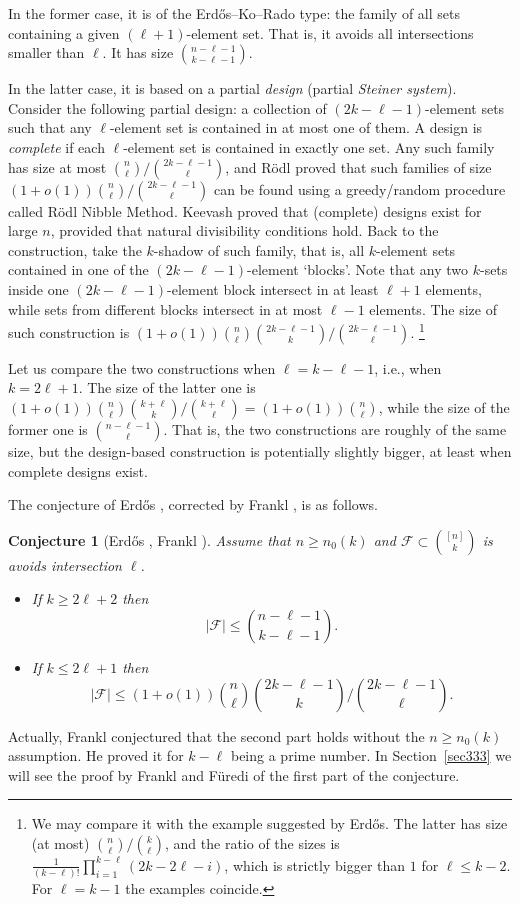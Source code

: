 \documentclass[graybox]{svmult}
\renewcommand{\le}{\leqslant}
\renewcommand{\ge}{\geqslant}
\newcommand{\ff}{\mathcal{F}}
\newtheorem{conj}{Conjecture}
\begin{document}
In the former case, it is of the Erd\H os--Ko--Rado type: the family of all sets containing a given $(\ell+1)$-element set. That is, it avoids all intersections smaller than $\ell$. It has size ${n-\ell-1\choose k-\ell-1}$.

In the latter case, it is based on a partial {\it design} (partial {\it Steiner system}). Consider the following partial design: a collection of $(2k-\ell-1)$-element sets such that any $\ell$-element set is contained in at most one of them.  A design is {\it complete} if each $\ell$-element set is contained in exactly one set. Any such family has size at most ${n\choose \ell}/{2k-\ell-1\choose \ell}$, and R\"odl \cite{Ro} proved that such families of size $(1+o(1)){n\choose \ell}/{2k-\ell-1\choose \ell}$ can be found using a greedy/random procedure called R\"odl Nibble Method. Keevash \cite{Kee} proved that (complete) designs exist for large $n$, provided that natural divisibility conditions hold. Back to the construction, take the $k$-shadow of such family, that is, all $k$-element sets contained in one of the  $(2k-\ell-1)$-element `blocks'. Note that any two $k$-sets inside one $(2k-\ell-1)$-element block intersect in at least $\ell+1$ elements, while sets from different blocks intersect in at most $\ell-1$ elements. The size of such construction is $(1+o(1)){n\choose \ell} {2k-\ell-1\choose k}/{2k-\ell-1\choose \ell}.$ \footnote{We may compare it with the example suggested by Erd\H os. The latter has size (at most) ${n\choose \ell}/{k\choose \ell}$, and the ratio of the sizes is $\frac 1{(k-\ell)!}\prod_{i=1}^{k-\ell}(2k-2\ell-i)$, which is strictly bigger than $1$ for $\ell\le k-2$. For $\ell=k-1$ the examples coincide.}

Let us compare the two constructions when $\ell = k-\ell-1$, i.e., when $k=2\ell+1$. The size of the latter one is $(1+o(1)){n\choose \ell} {k+\ell\choose k}/{k+\ell \choose \ell} = (1+o(1)){n\choose \ell}$, while the size of the former one is ${n-\ell-1\choose \ell}$. That is, the two constructions are roughly of the same size, but the design-based construction is potentially slightly bigger, at least when complete designs exist.

The conjecture of Erd\H os \cite{Erd75}, corrected by Frankl \cite{Fra83b}, is as follows.
\begin{conj}[Erd\H os \cite{Erd75}, Frankl \cite{Fra83b}]\label{conjff} Assume that $n\ge n_0(k)$ and $\ff\subset {[n]\choose k}$ is avoids intersection $\ell$.
  \begin{itemize}\item If $k\ge 2\ell+2$ then $$|\ff|\le {n-\ell-1\choose k-\ell-1}.$$
  \item If $k\le 2\ell+1$ then
  $$|\ff|\le (1+o(1)){n\choose \ell} {2k-\ell-1\choose k}/{2k-\ell-1\choose \ell}.$$
  \end{itemize}
\end{conj}
Actually, Frankl \cite{Fra83b} conjectured that the second part holds without the $n\ge n_0(k)$ assumption. He proved it for $k-\ell$ being a prime number. In Section~\ref{sec333} we will see the proof by Frankl and F\"uredi of the first part of the conjecture.
\end{document}
